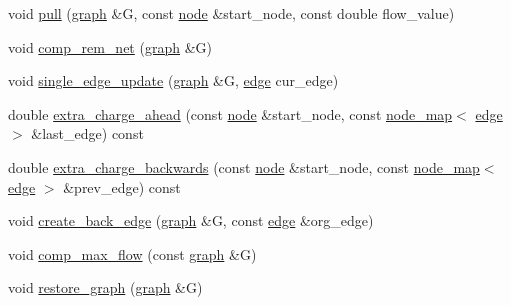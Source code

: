 \begin{DoxyCompactItemize}
\item 
void \mbox{\hyperlink{classmaxflow__pp_aba2aefadd6dde920b8b8aa44af95ad9b}{pull}} (\mbox{\hyperlink{classgraph}{graph}} \&G, const \mbox{\hyperlink{classnode}{node}} \&start\+\_\+node, const double flow\+\_\+value)
\item 
void \mbox{\hyperlink{classmaxflow__pp_a97612b9517f0f11715610cb8faa81606}{comp\+\_\+rem\+\_\+net}} (\mbox{\hyperlink{classgraph}{graph}} \&G)
\item 
void \mbox{\hyperlink{classmaxflow__pp_a3e59652a416d1553f8a1d1229dd2cd38}{single\+\_\+edge\+\_\+update}} (\mbox{\hyperlink{classgraph}{graph}} \&G, \mbox{\hyperlink{classedge}{edge}} cur\+\_\+edge)
\item 
double \mbox{\hyperlink{classmaxflow__pp_af60a96de8ef929ceefd32d387e8e1638}{extra\+\_\+charge\+\_\+ahead}} (const \mbox{\hyperlink{classnode}{node}} \&start\+\_\+node, const \mbox{\hyperlink{classnode__map}{node\+\_\+map}}$<$ \mbox{\hyperlink{classedge}{edge}} $>$ \&last\+\_\+edge) const
\item 
double \mbox{\hyperlink{classmaxflow__pp_a9d9651e53139201506b22eed1ecbdd51}{extra\+\_\+charge\+\_\+backwards}} (const \mbox{\hyperlink{classnode}{node}} \&start\+\_\+node, const \mbox{\hyperlink{classnode__map}{node\+\_\+map}}$<$ \mbox{\hyperlink{classedge}{edge}} $>$ \&prev\+\_\+edge) const
\item 
void \mbox{\hyperlink{classmaxflow__pp_a20abf72dadaac19acb027ff5fa62de2a}{create\+\_\+back\+\_\+edge}} (\mbox{\hyperlink{classgraph}{graph}} \&G, const \mbox{\hyperlink{classedge}{edge}} \&org\+\_\+edge)
\item 
void \mbox{\hyperlink{classmaxflow__pp_a6a8a301739757493318b1abfbed2698b}{comp\+\_\+max\+\_\+flow}} (const \mbox{\hyperlink{classgraph}{graph}} \&G)
\item 
void \mbox{\hyperlink{classmaxflow__pp_a273cc9bde3aeb47c08223da7458ed29d}{restore\+\_\+graph}} (\mbox{\hyperlink{classgraph}{graph}} \&G)
\end{DoxyCompactItemize}
